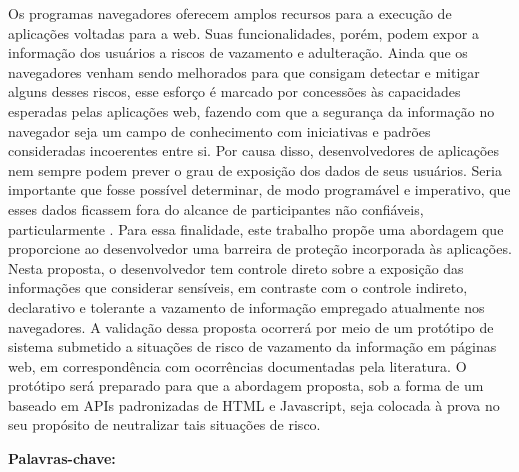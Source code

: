 \newpage
\begin{resumo}
\normalsize

Os programas navegadores oferecem amplos recursos para a execução de aplicações voltadas para a web. Suas funcionalidades, porém, podem expor a informação dos usuários a riscos de vazamento e adulteração. Ainda que os navegadores venham sendo melhorados para que consigam detectar e mitigar alguns desses riscos, esse esforço é marcado por concessões às capacidades esperadas pelas aplicações web, fazendo com que a segurança da informação no navegador seja um campo de conhecimento com iniciativas e padrões consideradas incoerentes entre si. Por causa disso, desenvolvedores de aplicações nem sempre podem prever o grau de exposição dos dados de seus usuários.
Seria importante que fosse possível determinar, de modo programável e imperativo, que esses dados ficassem fora do alcance de participantes não confiáveis, particularmente \scripts.
Para essa finalidade, este trabalho propõe uma abordagem que proporcione ao desenvolvedor uma barreira de proteção incorporada às aplicações. Nesta proposta, o desenvolvedor tem controle direto sobre a exposição das informações que considerar sensíveis, em contraste com o controle indireto, declarativo e tolerante a vazamento de informação empregado atualmente nos navegadores.
A validação dessa proposta ocorrerá por meio de um protótipo de sistema submetido a situações de risco de vazamento da informação em páginas web, em correspondência com ocorrências documentadas pela literatura. O protótipo será preparado para que a abordagem proposta, sob a forma de um \script baseado em APIs padronizadas de HTML e Javascript, seja colocada à prova no seu propósito de neutralizar tais situações de risco.


\vspace{\onelineskip}

\noindent
\textbf{Palavras-chave:} \imprimirpalavraschave
\end{resumo}

